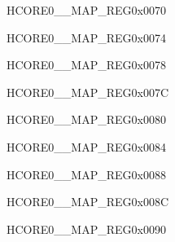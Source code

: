 \begin{register}{H}{CORE0\_\_MAP\_REG}{0x0070}\label{regdesc:CORE0I2S1INTMAPREG}
\end{register}\vspace{-3em}


\begin{register}{H}{CORE0\_\_MAP\_REG}{0x0074}\label{regdesc:CORE0I2S2INTMAPREG}
\end{register}\vspace{-3em}


\begin{register}{H}{CORE0\_\_MAP\_REG}{0x0078}\label{regdesc:CORE0UHCI0INTMAPREG}
\end{register}\vspace{-3em}


\begin{register}{H}{CORE0\_\_MAP\_REG}{0x007C}\label{regdesc:CORE0UART0INTMAPREG}
\end{register}\vspace{-3em}


\begin{register}{H}{CORE0\_\_MAP\_REG}{0x0080}\label{regdesc:CORE0UART1INTMAPREG}
\end{register}\vspace{-3em}


\begin{register}{H}{CORE0\_\_MAP\_REG}{0x0084}\label{regdesc:CORE0UART2INTMAPREG}
\end{register}\vspace{-3em}


\begin{register}{H}{CORE0\_\_MAP\_REG}{0x0088}\label{regdesc:CORE0UART3INTMAPREG}
\end{register}\vspace{-3em}


\begin{register}{H}{CORE0\_\_MAP\_REG}{0x008C}\label{regdesc:CORE0UART4INTMAPREG}
\end{register}\vspace{-3em}


\begin{register}{H}{CORE0\_\_MAP\_REG}{0x0090}\label{regdesc:CORE0LCDCAMINTMAPREG}
\end{register}\vspace{-3em}


